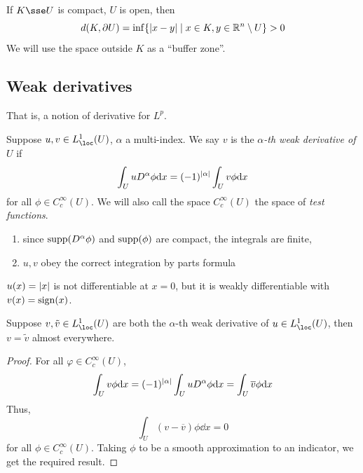 \documentclass{article}
\begin{document}
\begin{remark}
    If \(K \sse U\) is compact, \(U\) is open, then
    \[d(K, \partial U) = \inf\{\abs{x - y} \mid x \in K, y \in \mathbb{R}^n \setminus U\} > 0\]
    We will use the space outside \(K\) as a ``buffer zone''.
\end{remark}

\subsection{Weak derivatives}

That is, a notion of derivative for \(L^p\).

\begin{definition}
    Suppose \(u, v \in L^1_\loc(U)\), \(\alpha\) a multi-index. We say \(v\) is the \emph{\(\alpha\)-th weak derivative of \(U\)} if
    \[\int_U u D^\alpha \phi \dd x = (-1)^{\abs{\alpha}}\int_Uv\phi\dd x\]
    for all \(\phi \in C_c^\infty(U)\). We will also call the space \(C_c^\infty(U)\) the space of \emph{test functions}.
\end{definition}

\begin{remark}
    \begin{enumerate}
        \item since \(\operatorname{supp}(D^\alpha\phi)\) and \(\operatorname{supp}(\phi)\) are compact, the integrals are finite,
        \item \(u, v\) obey the correct integration by parts formula
    \end{enumerate}
\end{remark}

\begin{example}
    \(u(x) = \abs{x}\) is not differentiable at \(x = 0\), but it is weakly differentiable with \(v(x) = \operatorname{sign}(x)\).
\end{example}

\begin{lemma}
     Suppose \(v, \tilde v \in L^1_\loc(U)\) are both the \(\alpha\)-th weak derivative of \(u \in L^1_\loc(U)\), then \(v = \tilde v\) almost everywhere.
\end{lemma}

\begin{proof}
    For all \(\varphi \in C_c^\infty(U)\),
    \[\int_U v\phi \dd x = (-1)^\abs{\alpha}\int_U u D^\alpha \phi \dd x = \int_U\overline v \phi \dd x\]
    Thus,
    \[\int_U (v - \overline v)\phi \dd x = 0\]
    for all \(\phi \in C_c^\infty(U)\). Taking \(\phi\) to be a smooth approximation to an indicator, we get the required result.
\end{proof}
\end{document}

